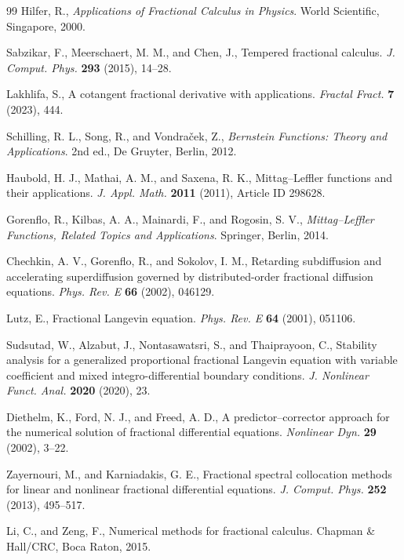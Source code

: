 \documentclass[11pt]{article}
\numberwithin{equation}{section}
\begin{document}
{\begin{thebibliography}{99}
Hilfer, R.,
\textit{Applications of Fractional Calculus in Physics}.
World Scientific, Singapore, 2000.

Sabzikar, F., Meerschaert, M. M., and Chen, J.,
Tempered fractional calculus.
\textit{J. Comput. Phys.}
\textbf{293} (2015), 14--28.

Lakhlifa, S.,
A cotangent fractional derivative with applications.
\textit{Fractal Fract.}
\textbf{7} (2023), 444.

Schilling, R. L., Song, R., and Vondraček, Z.,
\textit{Bernstein Functions: Theory and Applications}.
2nd ed., De Gruyter, Berlin, 2012.

Haubold, H. J., Mathai, A. M., and Saxena, R. K.,
Mittag--Leffler functions and their applications.
\textit{J. Appl. Math.}
\textbf{2011} (2011), Article ID 298628.

Gorenflo, R., Kilbas, A. A., Mainardi, F., and Rogosin, S. V.,
\textit{Mittag--Leffler Functions, Related Topics and Applications}.
Springer, Berlin, 2014.

Chechkin, A. V., Gorenflo, R., and Sokolov, I. M.,
Retarding subdiffusion and accelerating superdiffusion governed by distributed-order fractional diffusion equations.
\textit{Phys. Rev. E}
\textbf{66} (2002), 046129.

Lutz, E.,
Fractional Langevin equation.
\textit{Phys. Rev. E}
\textbf{64} (2001), 051106.

Sudsutad, W., Alzabut, J., Nontasawatsri, S., and Thaiprayoon, C.,
Stability analysis for a generalized proportional fractional Langevin equation with variable coefficient and mixed integro-differential boundary conditions.
\textit{J. Nonlinear Funct. Anal.}
\textbf{2020} (2020), 23.

Diethelm, K., Ford, N. J., and Freed, A. D.,
A predictor--corrector approach for the numerical solution of fractional differential equations.
\textit{Nonlinear Dyn.}
\textbf{29} (2002), 3--22.

Zayernouri, M., and Karniadakis, G. E.,
Fractional spectral collocation methods for linear and nonlinear fractional differential equations.
\textit{J. Comput. Phys.} \textbf{252} (2013), 495--517.

Li, C., and Zeng, F.,
Numerical methods for fractional calculus.
Chapman \& Hall/CRC, Boca Raton, 2015.



\end{thebibliography}}
\end{document}
